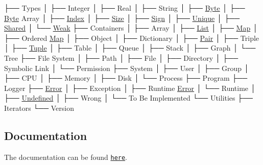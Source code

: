 \begin{DoxyCode}
├── Types
│   ├── Integer
│   ├── Real
│   ├── String
│   ├── \hyperlink{namespacelibrary_1_1core_1_1types_ae37635b89098069fb3b8c5181edd0945}{Byte}
│   ├── \hyperlink{namespacelibrary_1_1core_1_1types_ae37635b89098069fb3b8c5181edd0945}{Byte} Array
│   ├── \hyperlink{namespacelibrary_1_1core_1_1types_ad87eeb821d7067ec94e06ed1980d6350}{Index}
│   ├── \hyperlink{namespacelibrary_1_1core_1_1types_a701626ea1027888ebbb8cfd0ff7adab0}{Size}
│   ├── \hyperlink{namespacelibrary_1_1core_1_1types_a06d9eaa410d43a0fa3f383040618e87d}{Sign}
│   ├── \hyperlink{namespacelibrary_1_1core_1_1types_ac12d38691838fbc9a36765ee62ace52a}{Unique}
│   ├── \hyperlink{namespacelibrary_1_1core_1_1types_a3dae1a00f899bac0366794fa85eda8ee}{Shared}
│   └── \hyperlink{namespacelibrary_1_1core_1_1types_a26c13c272f9fba4ce17ee4980be6703c}{Weak}
├── Containers
│   ├── Array
│   ├── \hyperlink{namespacelibrary_1_1core_1_1ctnr_a87ccf40619002299b341a5e76e989912}{List}
│   ├── \hyperlink{namespacelibrary_1_1core_1_1ctnr_a248e088a0b4ec44aff451a5c3663dcee}{Map}
│   ├── Ordered \hyperlink{namespacelibrary_1_1core_1_1ctnr_a248e088a0b4ec44aff451a5c3663dcee}{Map}
│   ├── Object
│   ├── Dictionary
│   ├── \hyperlink{namespacelibrary_1_1core_1_1ctnr_aad6f8de4c0f279c10436d59d4ace74bd}{Pair}
│   ├── Triple
│   ├── \hyperlink{namespacelibrary_1_1core_1_1ctnr_a551ef72e2adb570c4d6bdf5e1bbc96b9}{Tuple}
│   ├── Table
│   ├── Queue
│   ├── Stack
│   ├── Graph
│   └── Tree
├── File System
│   ├── Path
│   ├── File
│   ├── Directory
│   ├── Symbolic Link
│   └── Permission
├── System
│   ├── User
│   ├── Group
│   ├── CPU
│   ├── Memory
│   ├── Disk
│   └── Process
├── Program
├── Logger
├── \hyperlink{namespacelibrary_1_1core_1_1logger_a35f71353edf64f68f7fe3874b01abaa8a902b0d55fddef6f8d651fe1035b7d4bd}{Error}
│   ├── Exception
│   ├── Runtime \hyperlink{namespacelibrary_1_1core_1_1logger_a35f71353edf64f68f7fe3874b01abaa8a902b0d55fddef6f8d651fe1035b7d4bd}{Error}
│   └── Runtime
│       ├── \hyperlink{namespacelibrary_1_1core_1_1types_a06d9eaa410d43a0fa3f383040618e87daec0fc0100c4fc1ce4eea230c3dc10360}{Undefined}
│       ├── Wrong
│       └── To Be Implemented
└── Utilities
    ├── Iterators
    └── Version
\end{DoxyCode}


\subsection*{Documentation}

The documentation can be found \href{https://open-space-collective.github.io/library-core}{\tt here}.

